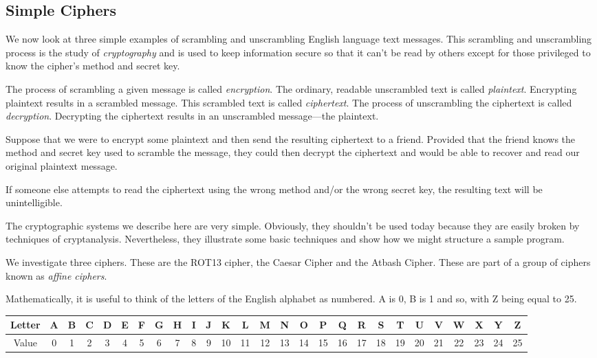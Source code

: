 \subsection{Simple Ciphers}

We now look at three simple examples of scrambling and unscrambling English language text messages. This scrambling and unscrambling process is the study of {\it cryptography} and is used to keep information secure so that it can't be read by others except for those privileged to know the cipher's method and secret key.

The process of scrambling a given message is called {\it encryption}. The ordinary, readable unscrambled text is called {\it plaintext}. Encrypting plaintext results in a scrambled message. This scrambled text is called {\it ciphertext}. The process of unscrambling the ciphertext is called {\it decryption}. Decrypting the ciphertext results in an unscrambled message---the plaintext.

Suppose that we were to encrypt some plaintext and then send the resulting ciphertext to a friend. Provided that the friend knows the method and secret key used to scramble the message, they could then decrypt the ciphertext and would be able to recover and read our original plaintext message.

If someone else attempts to read the ciphertext using the wrong method and/or the wrong secret key, the resulting text will be unintelligible.

The cryptographic systems we describe here are very simple. Obviously, they shouldn't be used today because they are easily broken by techniques of cryptanalysis. Nevertheless, they illustrate some basic techniques and show how we might structure a sample program.

We investigate three ciphers. These are the ROT13 cipher, the Caesar Cipher and the Atbash Cipher. These are part of a group of ciphers known as {\it affine ciphers}.

Mathematically, it is useful to think of the letters of the English alphabet as numbered. A is 0, B is 1 and so, with Z being equal to 25.

\begin{center}
{\setlength{\tabcolsep}{0.74mm}
\ttfamily

  \begin{tabular}{|c|c|c|c|c|c|c|c|c|c|c|c|c|c|c|c|c|c|c|c|c|c|c|c|c|c|c|}
  \hline
     Letter & A & B & C & D & E & F & G & H & I & J & K & L & M & N & O & P & Q & R & S & T & U & V & W & X & Y & Z \\ \hline
	Value & 0 & 1 & 2 & 3 & 4 & 5 & 6 & 7 & 8 & 9 & 10 & 11 & 12 & 13 & 14 & 15 & 16 & 17 & 18 & 19 & 20 & 21 & 22 & 23 & 24 & 25 \\ \hline
  \end{tabular}
}
\end{center}

